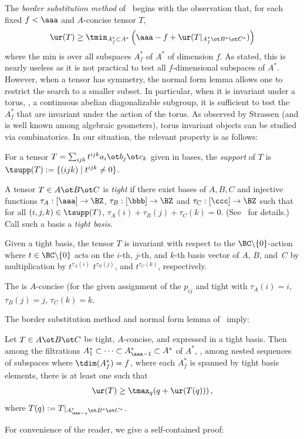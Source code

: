 \documentclass{toc}
\begin{document}
The \emph{border substitution method} of~\cite{MR3633766} begins with the observation that, for each fixed $f<\aaa$ and $A$-concise tensor $T$,
\begin{equation}\label{submeth}
\ur(T)\geq \tmin_{A^*_f\subset A^*}\left(\aaa-f+\ur(T|_{A^*_f\ot B^*\ot C^*})\right)
\end{equation}
where the min is over all subspaces $A^*_f$ of $A^*$ of  dimension $f$.   
As stated, this is nearly useless as it is not practical to test all $f$-dimensional subspaces of $A^*$.
However, when a tensor has symmetry, the normal form lemma \cite[Lem. 3.1]{MR3633766} allows one
to restrict the search to a smaller subset. In particular, when it is invariant under a torus,
\ie, a continuous
abelian diagonalizable subgroup, it is sufficient to test the $A^*_f$ that are invariant under the action of the torus.
As observed by Strassen (and is well known among algebraic geometers), torus invariant objects
can be studied via combinatorics. In our situation, the relevant property is as follows:

For a tensor $T=\sum_{ijk}t^{ijk} a_i\ot b_j\ot c_k$ given in bases, the \emph{support} of $T$
is $\tsupp(T):=\{ (ijk)\mid t^{ijk}\neq 0\}$.

\begin{definition}[\cite{MR1089800}]   %
A tensor $T\in A\ot B\ot C$ is \emph{tight} 
%
%
%
if there exist bases of $A,B,C$  and  
injective functions $\tau_A : [\aaa] \to \BZ$, $\tau_B : [\bbb] \to \BZ$ and $\tau_C : [\ccc] \to \BZ$ such that
for all $(i,j,k) \in \tsupp(T)$, $\tau_A(i) + \tau_B(j) + \tau_C(k)=0$. (See~\cite{MR4204580}  for details.)
 Call such a basis a \emph{tight basis}.
\end{definition}

Given a tight basis, %
%
the tensor $T$ is invariant with respect to the $\BC\backslash\{ 0\}$-action
where $t\in \BC\backslash\{ 0\}$ acts on
%
%
%
%
%
the $i$-th, $j$-th, and $k$-th
basis vector of $A$, $B$, and~$C$ by multiplication by  $t^{\tau_A(i)}$
$t^{\tau_B(j)}$, and $t^{\tau_C(k)}$, respectively.


The   %
is $A$-concise (for the given assignment of %
the $p_{ij}$  %
and tight with $\tau_A(i)=i$, $\tau_B(j)=j$, $\tau_C(k)=k$.

The border substitution method and normal form lemma of~\cite{MR3633766} imply:
\begin{proposition}\label{tightbapolarok}
Let $T\in A\ot B\ot C$ be tight,  $A$-concise, and expressed in a tight basis. Then among the filtrations $A_1^*\subset \cdots \subset A_{\aaa-1}^*\subset A^*$
of $A^*$,  \ie, among nested sequences of subspaces where $\tdim(A_f^*)=f$, 
where each $A^*_f$ is spanned by tight basis elements, there is at least one such that
$$
\ur(T)\geq \tmax_q(q+\ur(T(q)))\,,
$$
where $T(q):=T|_{A_{\aaa-q}^*\ot B^*\ot C^*}$.
\end{proposition}
For convenience of the reader, we give a self-contained proof:
\end{document}
